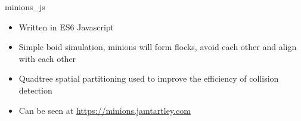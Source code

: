 \item minions\_js
\begin{itemize}
    \item Written in ES6 Javascript
    \item Simple boid simulation, minions will form flocks, avoid each other and align with each other
    \item Quadtree spatial partitioning used to improve the efficiency of collision detection
    \item Can be seen at \href{https://minions.jamtartley.com}{https://minions.jamtartley.com}
\end{itemize}
